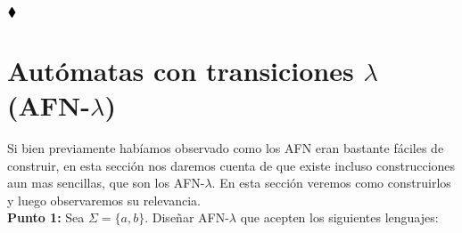 $\hfill \blacklozenge$

\section{Autómatas con transiciones \texorpdfstring{\boldmath$\lambda$}{lambda} (AFN-\texorpdfstring{\boldmath$\lambda$}{lambda})} 

Si bien previamente habíamos observado como los AFN eran bastante fáciles de construir, en esta sección nos daremos cuenta de que existe incluso construcciones aun mas sencillas, que son los AFN-$\lambda$. En esta sección veremos como construirlos y luego observaremos su relevancia.\\

\textbf{Punto 1: }Sea $\Sigma=\{a,b\}.$ Diseñar AFN-$\lambda$ que acepten los siguientes lenguajes:

